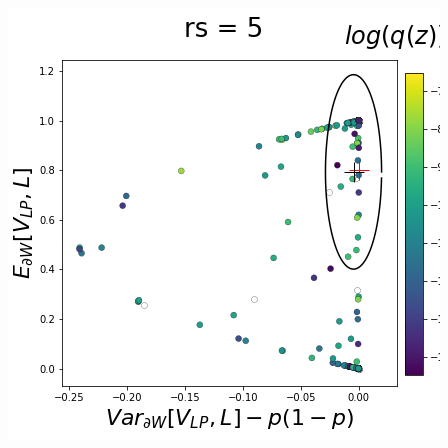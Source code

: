 \documentclass[11pt]{article}
\begin{document}
\begin{center}
\includegraphics[scale=0.33]{figs/T_x_SC_full_c=0_p=80_rs=5.png}
\end{center}



\end{document}

